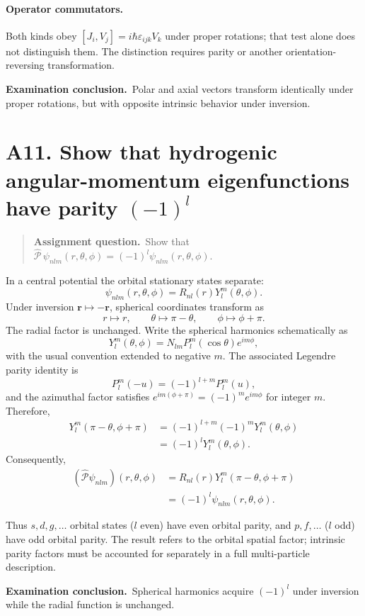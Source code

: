 \documentclass[11pt,a4paper]{article}
\theoremstyle{definition}
\newcommand{\PP}{\hat{\mathcal P}}
\newcommand{\result}[1]{\begin{center}\fcolorbox{light}{white}{\begin{minipage}{0.88\textwidth}\centering\vspace{2pt}\(\displaystyle #1\)\vspace{2pt}\end{minipage}}\end{center}}
\newenvironment{question}{\begin{quote}\small\noindent\textbf{Assignment question.}\ }{\end{quote}}
\newcommand{\exam}[1]{\par\medskip\noindent\textbf{Examination conclusion.}\ #1\par}
\begin{document}
\paragraph{Operator commutators.} Both kinds obey $[J_i,V_j]=i\hbar\varepsilon_{ijk}V_k$ under proper rotations; that test alone does not distinguish them. The distinction requires parity or another orientation-reversing transformation.
\exam{Polar and axial vectors transform identically under proper rotations, but with opposite intrinsic behavior under inversion.}

\section{A11. Show that hydrogenic angular-momentum eigenfunctions have parity $(-1)^l$}
\begin{question}Show that $\hat{\mathcal P}\,\psi_{nlm}(r,\theta,\phi)=(-1)^l\psi_{nlm}(r,\theta,\phi)$.\end{question}
In a central potential the orbital stationary states separate:
\begin{equation}
\psi_{nlm}(r,\theta,\phi)=R_{nl}(r)Y_l^m(\theta,\phi).
\end{equation}
Under inversion $\mathbf r\mapsto-\mathbf r$, spherical coordinates transform as
\begin{equation}
r\mapsto r,\qquad\theta\mapsto\pi-\theta,\qquad\phi\mapsto\phi+\pi.
\end{equation}
The radial factor is unchanged. Write the spherical harmonics schematically as
\begin{equation}
Y_l^m(\theta,\phi)=N_{lm}P_l^m(\cos\theta)e^{im\phi},
\end{equation}
with the usual convention extended to negative $m$. The associated Legendre parity identity is
\begin{equation}
P_l^m(-u)=(-1)^{l+m}P_l^m(u),
\end{equation}
and the azimuthal factor satisfies $e^{im(\phi+\pi)}=(-1)^m e^{im\phi}$ for integer $m$. Therefore,
\begin{align}
Y_l^m(\pi-\theta,\phi+\pi)
&=(-1)^{l+m}(-1)^mY_l^m(\theta,\phi)\\
&=(-1)^lY_l^m(\theta,\phi).
\end{align}
Consequently,
\begin{align}
(\PP\psi_{nlm})(r,\theta,\phi)
&=R_{nl}(r)Y_l^m(\pi-\theta,\phi+\pi)\\
&=(-1)^l\psi_{nlm}(r,\theta,\phi).
\end{align}
\result{\PP\psi_{nlm}=(-1)^l\psi_{nlm}.}
Thus $s,d,g,\ldots$ orbital states ($l$ even) have even orbital parity, and $p,f,\ldots$ ($l$ odd) have odd orbital parity. The result refers to the orbital spatial factor; intrinsic parity factors must be accounted for separately in a full multi-particle description.
\exam{Spherical harmonics acquire $(-1)^l$ under inversion while the radial function is unchanged.}
\end{document}
